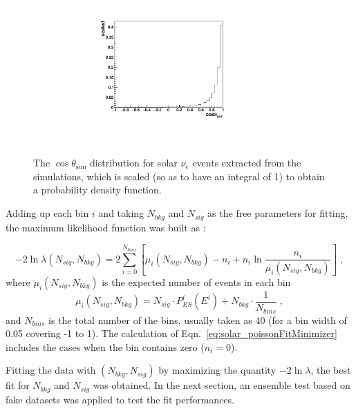 \begin{figure}[!htb]
	\centering
	\includegraphics[width=8cm]{solarPDF.pdf}
	\caption[The $\cos\theta_\mathrm{sun}$ distribution of solar $\nu_e$ used as a PDF function.]{The $\cos\theta_\mathrm{sun}$ distribution for solar $\nu_e$ events extracted from the simulations, which is scaled (so as to have an integral of 1) to obtain a probability density function.\label{solarPDF}}
\end{figure}

Adding up each bin $i$ and taking $N_{bkg}$ and $N_{sig}$ as the free parameters for fitting, the maximum likelihood function was built as \cite{pdg2020}:

\begin{equation}\label{eq:solar_poissonFitMinimizer}
-2\ln\mathcal \lambda(N_{sig},N_{bkg})
=2\sum_{i=0}^{N_{bins}}[\mu_i(N_{sig},N_{bkg})-n_i+n_i\ln\frac{n_i}{\mu_i(N_{sig},N_{bkg})}]\; ,
\end{equation}
where $\mu_i(N_{sig},N_{bkg})$ is the expected number of events in each bin
\begin{equation*}
\mu_i(N_{sig},N_{bkg})=N_{sig}\cdot P^i_{ES}(E^i)+N_{bkg}\cdot\frac{1}{N_{bins}}\; ,
\end{equation*}
and $N_{bins}$ is the total number of the bins, usually taken as 40 (for a bin width of 0.05 covering -1 to 1). The calculation of Eqn.~\ref{eq:solar_poissonFitMinimizer} includes the cases when the bin contains zero ($n_i=0$).

Fitting the data with $(N_{bkg},N_{sig})$ by maximizing the quantity $-2\ln\mathcal\lambda$, the best fit for $N_{bkg}$ and $N_{sig}$ was obtained. In the next section, an ensemble test based on fake datasets was applied to test the fit performances.
%
%
